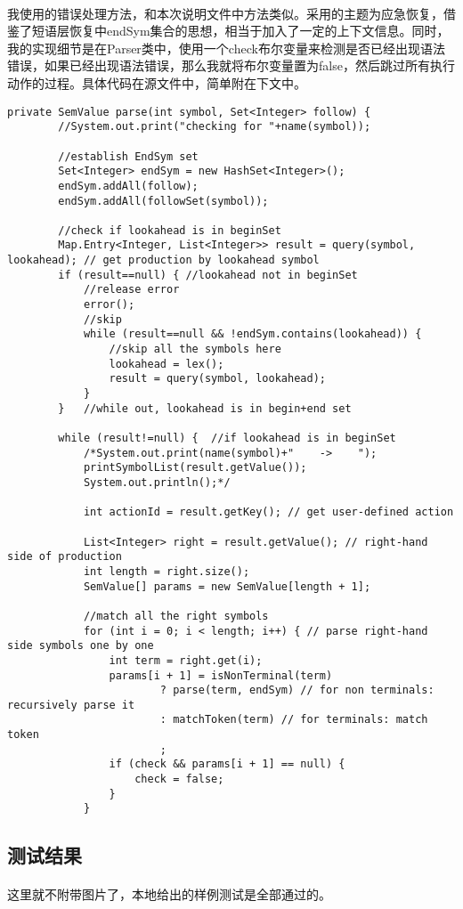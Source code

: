 \documentclass[UTF8]{ctexart}
\begin{document}
\paragraph{}我使用的错误处理方法，和本次说明文件中方法类似。采用的主题为应急恢复，借鉴了短语层恢复中endSym集合的思想，相当于加入了一定的上下文信息。同时，我的实现细节是在Parser类中，使用一个check布尔变量来检测是否已经出现语法错误，如果已经出现语法错误，那么我就将布尔变量置为false，然后跳过所有执行动作的过程。具体代码在源文件中，简单附在下文中。
\begin{lstlisting}
private SemValue parse(int symbol, Set<Integer> follow) {
		//System.out.print("checking for "+name(symbol));

		//establish EndSym set
		Set<Integer> endSym = new HashSet<Integer>();
		endSym.addAll(follow);
		endSym.addAll(followSet(symbol));

		//check if lookahead is in beginSet
        Map.Entry<Integer, List<Integer>> result = query(symbol, lookahead); // get production by lookahead symbol
		if (result==null) {	//lookahead not in beginSet
			//release error
			error();
			//skip
			while (result==null && !endSym.contains(lookahead)) {
				//skip all the symbols here
				lookahead = lex();
				result = query(symbol, lookahead);
			}
		}	//while out, lookahead is in begin+end set

		while (result!=null) {	//if lookahead is in beginSet
			/*System.out.print(name(symbol)+"    ->    ");
			printSymbolList(result.getValue());
			System.out.println();*/

			int actionId = result.getKey(); // get user-defined action

			List<Integer> right = result.getValue(); // right-hand side of production
			int length = right.size();
			SemValue[] params = new SemValue[length + 1];

			//match all the right symbols
			for (int i = 0; i < length; i++) { // parse right-hand side symbols one by one
				int term = right.get(i);
				params[i + 1] = isNonTerminal(term)
						? parse(term, endSym) // for non terminals: recursively parse it
						: matchToken(term) // for terminals: match token
						;
				if (check && params[i + 1] == null) {
					check = false;
				}
			}
\end{lstlisting}
\subsection{测试结果}
\paragraph{}这里就不附带图片了，本地给出的样例测试是全部通过的。
\end{document}
